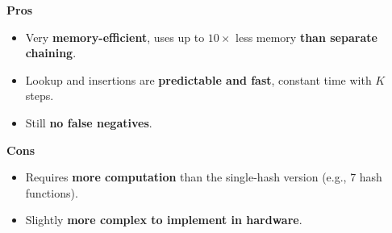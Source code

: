 \highspace
\begin{flushleft}
    \textcolor{Green3}{ \textbf{Pros}}
\end{flushleft}
\begin{itemize}[label=\textcolor{Green3}{}]
    \item Very \textbf{memory-efficient}, uses up to $10\times$ less memory \textbf{than separate chaining}.
    \item Lookup and insertions are \textbf{predictable and fast}, constant time with $K$ steps.
    \item Still \textbf{no false negatives}.
\end{itemize}

\highspace
\begin{flushleft}
    \textcolor{Red2}{ \textbf{Cons}}
\end{flushleft}
\begin{itemize}[label=\textcolor{Red2}{}]
    \item Requires \textbf{more computation} than the single-hash version (e.g., 7 hash functions).
    \item Slightly \textbf{more complex to implement in hardware}.
\end{itemize}